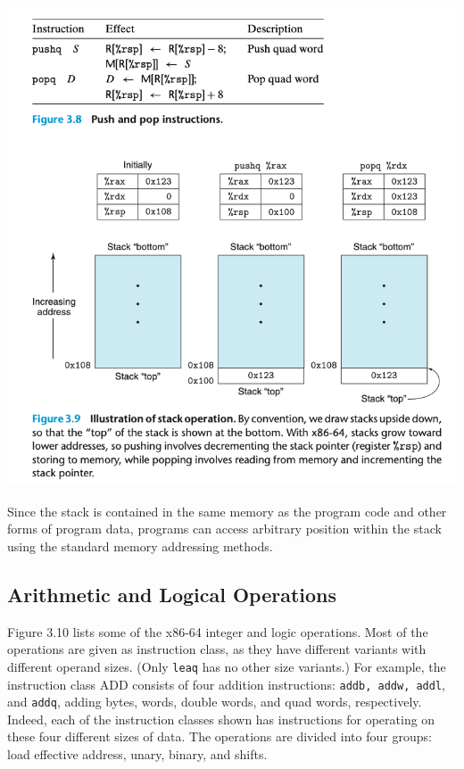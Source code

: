 \documentclass[11pt]{article}
\begin{document}
\begin{center}
\includegraphics[width=.9\linewidth]{pics/push-and-pop.png}
\end{center}


Since the stack is contained in the same memory as the program code and other forms of program data, programs can access arbitrary position within the stack using the standard memory addressing methods.\\

\subsection{Arithmetic and Logical Operations}
\label{sec:org318a33d}
Figure 3.10 lists some of the x86-64 integer and logic operations. Most of the operations are given as instruction class, as they have different variants with different operand sizes. (Only \texttt{leaq} has no other size variants.) For example, the instruction class ADD consists of four addition instructions: \texttt{addb, addw, addl}, and \texttt{addq}, adding bytes, words, double words, and quad words, respectively. Indeed, each of the instruction classes shown has instructions for operating on these four different sizes of data. The operations are divided into four groups: load effective address, unary, binary, and shifts.\\
\end{document}
